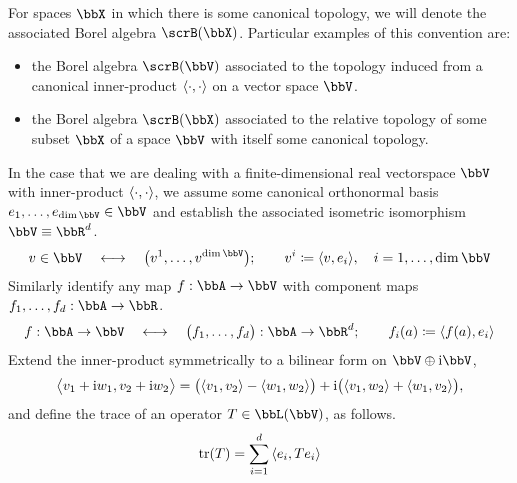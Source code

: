 For spaces $\stateSpace$ in which there is some canonical topology, we will denote the associated Borel algebra $\scrB(\stateSpace)$.
Particular examples of this convention are:
\begin{itemize}
  \item
    the Borel algebra $\scrB(\vecSpace)$ associated to the topology induced from a canonical inner-product ${\langle \cdot , \cdot \rangle}$ on a vector space $\vecSpace$.
  \item
    the Borel algebra $\scrB(\stateSpace)$ associated to the relative topology of some subset $\stateSpace$ of a space $\vecSpace$ with itself some canonical topology.
\end{itemize}
In the case that we are dealing with a finite-dimensional real vectorspace $\vecSpace$ with inner-product ${\langle \cdot , \cdot \rangle}$, we assume some canonical orthonormal basis $\basisVec_1, \ldots, \basisVec_{\operatorname{dim}\vecSpace} \in \vecSpace$ and establish the associated isometric isomorphism $\vecSpace \equiv \bbR^d$.
\begin{equation*}
  \vecVar \in \vecSpace \quad\longleftrightarrow\quad \big(\vecVar^1, \ldots, \vecVar^{\operatorname{dim}\vecSpace}\big); \qquad \vecVar^i \defeq \prj{\vecVar}{\basisVec_i}, \quad i = 1, \ldots, \operatorname{dim}\vecSpace
\end{equation*}
Similarly identify any map $f: \bbA \rightarrow \vecSpace$ with component maps $f_1, \ldots, f_d: \bbA \rightarrow \bbR$.
\begin{equation*}
  f: \bbA \rightarrow \vecSpace \quad\longleftrightarrow\quad \big(f_1,\ldots, f_d\big): \bbA \rightarrow \bbR^d; \qquad f_i(a) \defeq \prj{f(a)}{\basisVec_i}
\end{equation*}
Extend the inner-product symmetrically to a bilinear form on $\vecSpace\oplus\im\vecSpace$,
\begin{equation*}
  {\big\langle v_1+{\rm i}w_1 , v_2 + {\rm i}w_2 \big\rangle} = \big({\langle v_1 , v_2 \rangle} - {\langle w_1 , w_2 \rangle}\big) + {\rm i}\big({\langle v_1 , w_2 \rangle} + {\langle w_1 , v_2 \rangle}\big),
\end{equation*}
and define the trace of an operator $T \in \bbL(\vecSpace)$, as follows.
\begin{equation*}
  \operatorname{tr}(T) = \sum_{i=1}^d {\langle e_i , Te_i \rangle}
\end{equation*}

